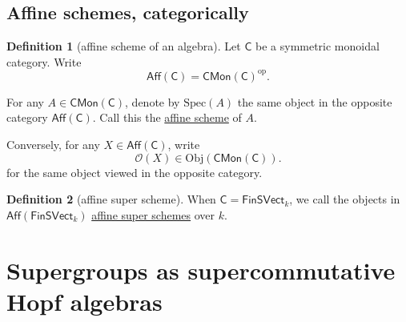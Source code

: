 \documentclass[a4paper,10pt]{scrreprt}
\newcommand{\defn}[1]{\ul{#1}}
\newcommand{\Obj}{\mathrm{Obj}}
\newcommand{\Spec}{\mathrm{Spec}}
\theoremstyle{definition}
\newtheorem{definition}{Definition}[section]
\theoremstyle{plain}
\theoremstyle{remark}
\begin{document}
\subsection{Affine schemes, categorically}
\begin{definition}[affine scheme of an algebra]
  \label{def:affineschemeofanalgebra}
  Let $\mathsf{C}$ be a symmetric monoidal category. Write
  \begin{equation*}
    \mathsf{Aff}(\mathsf{C}) = \mathsf{CMon}(\mathsf{C})^{\text{op}}.
  \end{equation*}

  For any $A \in \mathsf{CMon}(\mathsf{C})$, denote by $\Spec(A)$ the same object in the opposite category $\mathsf{Aff}(\mathsf{C})$. Call this the \defn{affine scheme} of $A$.

  Conversely, for any $X \in \mathsf{Aff}(\mathsf{C})$, write 
  \begin{equation*}
    \mathscr{O}(X) \in \Obj(\mathsf{CMon}(\mathsf{C})).
  \end{equation*}
  for the same object viewed in the opposite category.
\end{definition}

\begin{definition}[affine super scheme]
  \label{def:affinesuperscheme}
  When $\mathsf{C} = \mathsf{FinSVect}_{k}$, we call the objects in $\mathsf{Aff}(\mathsf{FinSVect}_{k})$ \defn{affine super schemes} over $k$.
\end{definition}

\section{Supergroups as supercommutative Hopf algebras}
\end{document}

